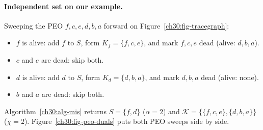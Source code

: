 \paragraph{Independent set on our example.}
Sweeping the PEO $f,c,e,d,b,a$ forward on Figure~\ref{ch30:fig-tracegraph}:
\begin{itemize}
  \item $f$ is alive: add $f$ to $S$, form $K_f=\{f,c,e\}$, and mark $f,c,e$ dead (alive: $d,b,a$).
  \item $c$ and $e$ are dead: skip both.
  \item $d$ is alive: add $d$ to $S$, form $K_d=\{d,b,a\}$, and mark $d,b,a$ dead (alive: none).
  \item $b$ and $a$ are dead: skip both.
\end{itemize}
Algorithm~\ref{ch30:alg-mis} returns $S=\{f,d\}$ ($\alpha=2$) and $\mathcal{K}=\bigl\{\{f,c,e\},\{d,b,a\}\bigr\}$ ($\bar\chi=2$). Figure~\ref{ch30:fig-peo-duals} puts both PEO sweeps side by side.

